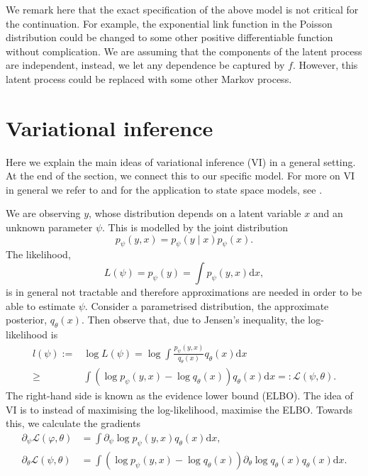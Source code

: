 \documentclass[preprint,12pt]{elsarticle}
\newcommand{\pa}[1]{\left(#1\right)}
\def\dd{\ensuremath{\mathrm{d}}}
\begin{document}
We remark here that the exact specification of the above model is not critical for the continuation. For example, the exponential link function in the Poisson distribution could be changed to some other positive differentiable function without complication. We are assuming that the components of the latent process are independent, instead, we let any dependence be captured by $f$. However, this latent process could be replaced with some other Markov process.

\section{Variational inference}\label{sec:vi}
Here we explain the main ideas of variational inference (VI) in a general setting. At the end of the section, we connect this to our specific model. For more on VI in general we refer to \cite{ranganath2014black} and for the application to state space models, see \cite{archer2015black}.
 
We are observing $y$, whose distribution depends on a latent variable $x$ and an unknown parameter $\psi$. This is modelled by the joint distribution
\begin{equation}
	p_\psi(y,x) = p_\psi(y\mid x)p_\psi(x).
\end{equation}
The likelihood,
\begin{equation}
	L(\psi)=p_\psi(y) = \int p_\psi(y,x)\dd x,
\end{equation}
is in general not tractable and therefore approximations are needed in order to be able to estimate $\psi$.
Consider a parametrised distribution, the approximate posterior, $q_\theta(x)$. Then observe that, due to Jensen's inequality, the log-likelihood is
\begin{align*}
	l(\psi):=&\log L(\psi) = \log \int \frac{p_\psi(y,x)}{q_\theta(x)} q_\theta(x)\dd x  \\
    \geq &\int \pa{\log p_\psi(y,x) - \log q_\theta(x)}q_\theta(x)\dd x=:\mathcal L(\psi,\theta).
\end{align*}
The right-hand side is known as the evidence lower bound (ELBO). The idea of VI is to instead of maximising the log-likelihood, maximise the ELBO. Towards this, we calculate the gradients
\begin{align}
	\partial_\psi \mathcal L(\varphi,\theta) &= \int \partial_\psi \log p_\psi(y,x)q_\theta(x) \dd x ,\\
	\partial_\theta \mathcal L(\psi,\theta) &=  \int (\log p_\psi(y,x) - \log q_\theta(x))\partial_\theta \log q_\theta(x)  q_\theta(x)   \dd x.
\end{align}
\end{document}
